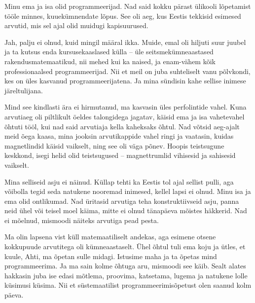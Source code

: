 \label{sisu:ahti}

Minu ema ja isa olid 
programmeerijad. Nad said kokku pärast ülikooli lõpetamist tööle minnes, 
kuuekümnendate lõpus. See oli aeg, kus Eestis tekkisid 
esimesed arvutid, mis sel ajal olid muidugi kapisuurused.


Jah, palju ei olnud, kuid 
mingil määral ikka. Muide, emal oli hiljuti  
suur juubel ja ta kutsus enda 
kursusekaaslased külla -- üle seitsmekümneaastased
rakendusmatemaatikud, nii mehed kui ka naised, ja enam-vähem kõik  
professionaalsed programmeerijad. Nii et meil on juba 
suhteliselt vanu põlvkondi, kes on üles kasvanud programmeerijatena. Ja mina 
sündisin kahe sellise inimese järeltulijana.


Mind see kindlasti ära ei hirmutanud, ma kasvasin üles perfolintide vahel. 
Kuna arvutiaeg oli piltlikult öeldes talongidega 
jagatav, käisid ema ja isa vahetevahel
õhtuti tööl, kui nad said arvutiaja kella kaheksaks õhtul. 
Nad võtsid aeg-ajalt meid õega kaasa, mina jooksin arvutikappide vahel ringi ja 
vaatasin, kuidas 
magnetlindid käisid vaikselt, ning see oli väga põnev. 
Hoopis teistsugune keskkond, isegi helid olid teistsugused -- magnettrumlid 
vihisesid ja sahisesid vaikselt.


Mina selliseid asju ei näinud. Küllap tehti ka Eestis tol ajal 
sellist pulli, aga võibolla tegid seda natukene nooremad inimesed, kellel 
lapsi ei olnud. Minu isa ja ema olid ontlikumad. Nad 
üritasid arvutiga teha konstruktiivseid asju, panna neid 
ühel või teisel moel käima, mitte ei olnud tänapäeva mõistes häkkerid. Nad ei 
mõelnud, mismoodi näiteks arvutiga pead pesta.


Ma olin lapsena vist küll matemaatiliselt andekas, aga esimene otsene kokkupuude
arvutitega oli kümneaastaselt. Ühel õhtul tuli ema koju ja 
ütles, et kuule, Ahti, ma õpetan sulle midagi. Istusime maha ja 
ta õpetas mind programmeerima. Ja ma sain 
kolme õhtuga aru, mismoodi see käib. Sealt 
alates hakkasin juba ise edasi mõtlema, proovima, katsetama, lugema ja 
natukene lolle küsimusi küsima. Nii et süstemaatilist 
programmeerimisõpetust olen saanud kolm päeva.

